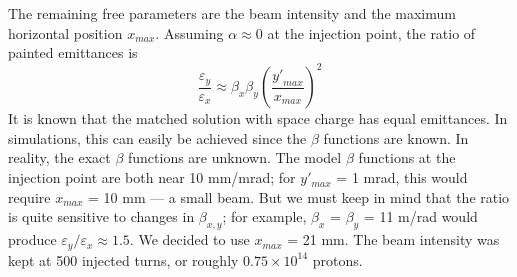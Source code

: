 The remaining free parameters are the beam intensity and the maximum horizontal position $x_{max}$. Assuming $\alpha \approx 0$ at the injection point, the ratio of painted emittances is
%
\begin{equation}
    \frac{\varepsilon_y}{\varepsilon_x} \approx 
    \beta_x \beta_y \left(\frac{{y'}_{max}}{x_{max}}\right)^2 
\end{equation}
%
It is known that the matched solution with space charge has equal emittances. In simulations, this can easily be achieved since the $\beta$ functions are known. In reality, the exact $\beta$ functions are unknown. The model $\beta$ functions at the injection point are both near 10 mm/mrad; for $y'_{max}$ = 1 mrad, this would require $x_{max}$ = 10 mm — a small beam. But we must keep in mind that the ratio is quite sensitive to changes in $\beta_{x, y}$; for example, $\beta_x$ = $\beta_y$ = 11 m/rad would produce $\varepsilon_y / \varepsilon_x \approx 1.5$. We decided to use $x_{max}$ = 21 mm. The beam intensity was kept at 500 injected turns, or roughly $0.75 \times 10^{14}$ protons.

